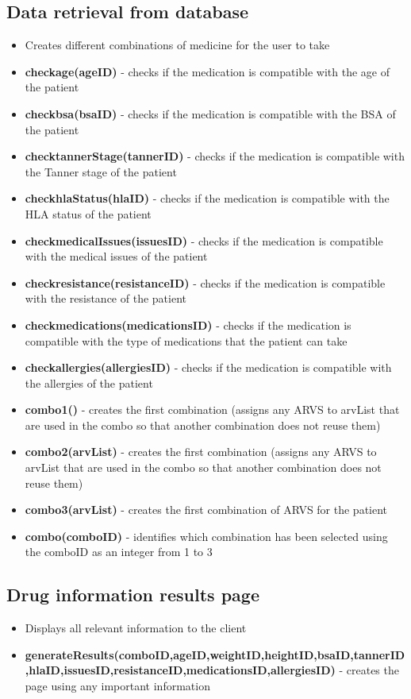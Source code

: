 \documentclass[12pt]{article}
\begin{document}
\subsection{Data retrieval from database}
\begin{itemize}
\item Creates different combinations of medicine for the user to take
\item \textbf{checkage(ageID)} - checks if the medication is compatible with the age of the patient
\item \textbf{checkbsa(bsaID)} - checks if the medication is compatible with the BSA of the patient
\item \textbf{checktannerStage(tannerID)} - checks if the medication is compatible with the Tanner stage of the patient
\item \textbf{checkhlaStatus(hlaID)} - checks if the medication is compatible with the HLA status of the patient
\item \textbf{checkmedicalIssues(issuesID)} - checks if the medication is compatible with the medical issues of the patient
\item \textbf{checkresistance(resistanceID)} - checks if the medication is compatible with the resistance of the patient
\item \textbf{checkmedications(medicationsID)} - checks if the medication is compatible with the type of medications that the patient can take
\item \textbf{checkallergies(allergiesID)} - checks if the medication is compatible with the allergies of the patient
\item \textbf{combo1()} - creates the first combination (assigns any ARVS to arvList that are used in the combo so that another combination does not reuse them)
\item \textbf{combo2(arvList)} - creates the first combination (assigns any ARVS to arvList that are used in the combo so that another combination does not reuse them)
\item \textbf{combo3(arvList)} - creates the first combination of ARVS for the patient
\item \textbf{combo(comboID)} - identifies which combination has been selected using the comboID as an integer from 1 to 3
\end{itemize}


\subsection{Drug information results page}
\begin{itemize}
\item Displays all relevant information to the client
\item\textbf{generateResults(comboID,ageID,weightID,heightID,bsaID,tannerID,hlaID,issuesID,resistanceID,medicationsID,allergiesID)} - creates the page using any important information
\end{itemize}
\end{document}
